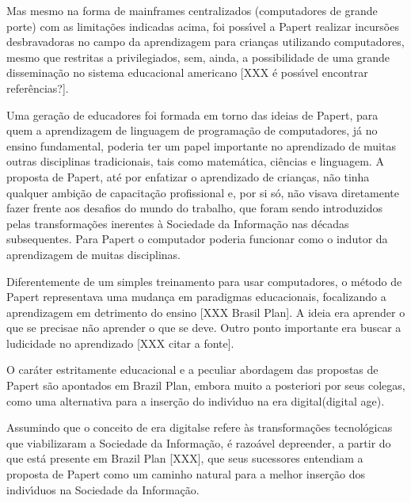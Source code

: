 \documentclass[
12pt,		%
openright,	%
twoside,  %
a4paper,			%
chapter=TITLE,		%
english,			%
french,				%
spanish,			%
brazil				%
]{USPSC-classe/USPSC}
\begin{document}
Mas mesmo na forma de mainframes centralizados (computadores de grande porte) com as limita\c{c}\~oes indicadas acima, foi poss\'{\i}vel a Papert realizar incurs\~oes desbravadoras no campo da aprendizagem para crian\c{c}as utilizando computadores, mesmo que restritas a privilegiados, sem, ainda, a possibilidade de uma grande dissemina\c{c}\~ao no sistema educacional americano [XXX \'e poss\'{\i}vel encontrar refer\^encias?].


Uma gera\c{c}\~ao de educadores foi formada em torno das ideias de Papert, para quem a aprendizagem de linguagem de programa\c{c}\~ao de computadores, j\'a no ensino fundamental, poderia ter um papel importante no aprendizado de muitas outras disciplinas tradicionais, tais como matem\'atica, ci\^encias e linguagem. A proposta de Papert, at\'e por enfatizar o aprendizado de crian\c{c}as, n\~ao tinha qualquer ambi\c{c}\~ao de capacita\c{c}\~ao profissional e, por si s\'o, n\~ao visava diretamente fazer frente aos desafios do \textquotedbl mundo do trabalho\textquotedbl , que foram sendo introduzidos pelas transforma\c{c}\~oes inerentes \`a Sociedade da Informa\c{c}\~ao nas d\'ecadas subsequentes. Para Papert o computador poderia funcionar como o indutor da aprendizagem de muitas disciplinas.


Diferentemente de um simples treinamento para usar computadores, o m\'etodo de Papert representava uma mudan\c{c}a em paradigmas educacionais, focalizando a aprendizagem em detrimento do ensino [XXX Brasil Plan]. A ideia era \textquotedbl aprender o que se precisa\textquotedbl  e n\~ao \textquotedbl aprender o que se deve. Outro ponto importante era buscar a ludicidade no aprendizado [XXX citar a fonte].


O car\'ater estritamente educacional e a peculiar abordagem das propostas de Papert s\~ao apontados em \textquotedbl Brazil Plan\textquotedbl  [XXX], embora muito a posteriori por seus colegas, como uma alternativa para a inser\c{c}\~ao do indiv\'{\i}duo na \textquotedbl era digital\textquotedbl  (digital age).


Assumindo que o conceito de \textquotedbl era digital\textquotedbl  se refere \`as transforma\c{c}\~oes tecnol\'ogicas que viabilizaram a  \textquotedbl Sociedade da Informa\c{c}\~ao\textquotedbl ,  \'e razo\'avel depreender, a partir do que est\'a presente em Brazil Plan [XXX], que seus sucessores entendiam a proposta de Papert como um caminho natural para a melhor inser\c{c}\~ao dos indiv\'{\i}duos na Sociedade da Informa\c{c}\~ao.
\end{document}
